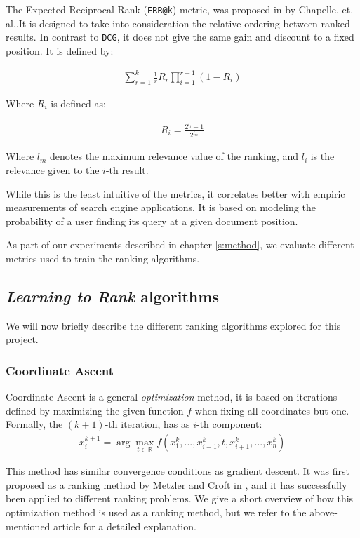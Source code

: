 The Expected Reciprocal Rank (\texttt{ERR@k}) metric, was proposed in \cite{10.1145/1645953.1646033}
by Chapelle, et. al..It is designed to take into consideration the relative ordering between ranked results.
In contrast to \texttt{DCG}, it does not give the same gain and discount to a fixed position.
It is defined by:

\begin{align*}
\sum_{r=1}^k \frac{1}{r} R_r \prod_{i=1}^{r-1}(1-R_i)
\end{align*}

Where $R_i$ is defined as:

\begin{align*}
R_i = \frac{2^{l_i}-1}{2^{l_m}}
\end{align*}

Where $l_m$ denotes the maximum relevance value of the ranking, and $l_i$ is the relevance given to the $i$-th result.

While this is the least intuitive of the metrics, it correlates better with empiric measurements of search engine applications\cite{10.1145/1645953.1646033}.
It is based on modeling the probability of a user finding its query at a given document position.

As part of our experiments described in chapter \ref{s:method}, we evaluate different metrics
used to train the ranking algorithms. 

\subsection{\emph{Learning to Rank} algorithms}\label{s:bg-tsp-ltr-algs}

We will now briefly describe the different ranking algorithms explored for this project.

\subsubsection{Coordinate Ascent}
Coordinate Ascent is a general \textit{optimization} method, it is based on iterations defined
by maximizing the given function $f$ when fixing all coordinates but one. Formally, the $(k+1)$-th iteration,
has as $i$-th component:
\begin{align*}
x^{k+1}_i = \arg \max_{t\in\mathbb{R}} f(x^{k}_1, ..., x^{k}_{i-1}, t, x^{k}_{i+1}, ..., x^k_n)
\end{align*}

This method has similar convergence conditions as gradient descent. It was first proposed as a
ranking method by Metzler and Croft in \cite{Metzler2006LinearFM}, and it has successfully been applied
to different ranking problems. We give a short overview of how this optimization method is used as
a ranking method, but we refer to the above-mentioned article for a detailed explanation.

